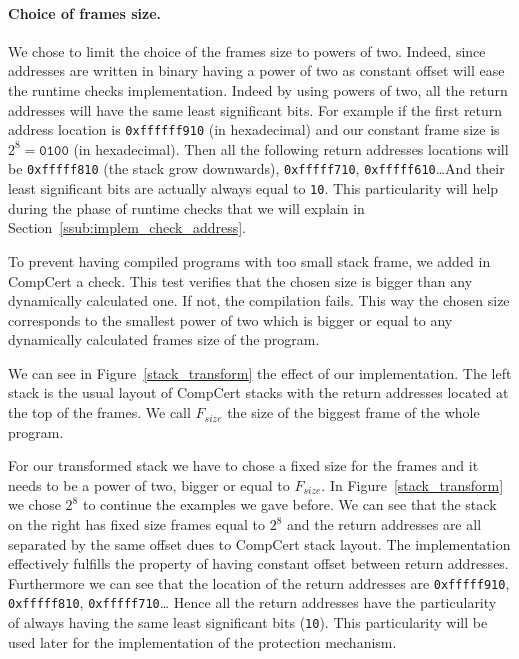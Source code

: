 \documentclass[11pt]{sdm}
\begin{document}
\paragraph{Choice of frames size.}
\label{par:Choice of frames size}

We chose to limit the choice of the frames size to powers of two. Indeed, since addresses are written in binary having a power of two as constant offset will ease the runtime checks implementation. Indeed by using powers of two, all the return addresses will have the same least significant bits. For example if the first return address location is \texttt{0xffffff910} (in hexadecimal) and our constant frame size is $2^8 = \texttt{0100}$ (in hexadecimal). Then all the following return addresses locations will be \texttt{0xfffff810} (the stack grow downwards), \texttt{0xfffff710}, \texttt{0xfffff610}\dots And their least significant bits are actually always equal to \texttt{10}. This particularity will help during the phase of runtime checks that we will explain in Section~\ref{ssub:implem_check_address}.

To prevent having compiled programs with too small stack frame, we added in CompCert a check. This test verifies that the chosen size is bigger than any dynamically calculated one. If not, the compilation fails. This way the chosen size corresponds to the smallest power of two which is bigger or equal to any dynamically calculated frames size of the program.

We can see in Figure~\ref{stack_transform} the effect of our implementation. 
The left stack is the usual layout of CompCert stacks with the return addresses located at the top of the frames. We call $F_{size}$ the size of the biggest frame of the whole program.

For our transformed stack we have to chose a fixed size for the frames and it needs to be a power of two, bigger or equal to $F_{size}$. In Figure~\ref{stack_transform} we chose $2^8$ to continue the examples we gave before.
We can see that the stack on the right has fixed size frames equal to $2^8$ and the return addresses are all separated by the same offset dues to CompCert stack layout.
The implementation effectively fulfills the property of having constant offset between return addresses.
Furthermore we can see that the location of the return addresses are \texttt{0xfffff910}, \texttt{0xfffff810}, \texttt{0xfffff710}\dots
Hence all the return addresses have the particularity of always having the same least significant bits (\texttt{10}). This particularity will be used later for the implementation of the protection mechanism.
\end{document}
